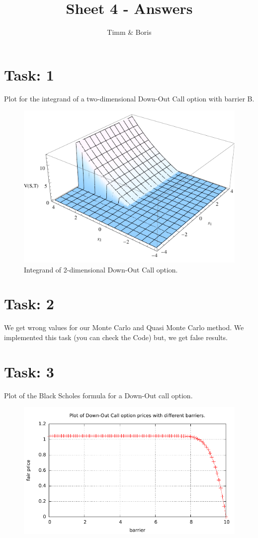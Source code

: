\documentclass{article}
\title{Sheet 4 - Answers}
\author{Timm \& Boris}
\begin{document}
\maketitle

\section*{Task: 1}
Plot for the integrand of a two-dimensional Down-Out Call option with barrier B.
\begin{figure}[htbp]
  \centering
     \includegraphics[width=1.0\textwidth]{../Task01/task01_plot.pdf}
  \caption*{Integrand of 2-dimensional Down-Out Call option.}
\end{figure}

\section*{Task: 2}
We get wrong values for our Monte Carlo and Quasi Monte Carlo method. We implemented this task (you can check the Code) but, we get false results.

\section*{Task: 3}
Plot of the Black Scholes formula for a Down-Out call option.
\begin{figure}[htbp]
  \centering
     \includegraphics[width=1.0\textwidth]{../Task03/sh4_task3_price_plot.pdf}
\end{figure}
\end{document}
